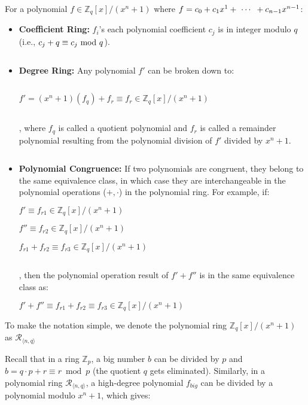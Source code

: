 \begin{tcolorbox}[title={\textbf{\tboxlabel{\ref*{subsec:poly-ring-overview}} Ring}}]

For a polynomial $f \in \mathbb{Z}_q[x] / (x^n + 1)$ where $f = c_0 + c_1x^1 + \text{ } \text{$\cdots$} \text{ } + c_{n-1}x^{n-1}$:

\begin{itemize}
\item \textbf{Coefficient Ring:} $f_i$'s each polynomial coefficient $c_j$ is in integer modulo $q$ (i.e., $c_j + q \equiv c_j \text{ } \text{\text{mod}} \text{ } q$). 

$ $

\item \textbf{Degree Ring:} Any polynomial $f'$ can be broken down to: 

$ $

$f' = (x^n + 1)(f_q) + f_r \equiv f_r \in \mathbb{Z}_q[x]/(x^n + 1)$

$ $

, where $f_q$ is called a quotient polynomial and $f_r$ is called a remainder polynomial resulting from the polynomial division of $f'$ divided by $x^n + 1$.

$ $

\item \textbf{Polynomial Congruence:} If two polynomials are congruent, they belong to the same equivalence class, in which case they are interchangeable in the polynomial operations ($+, \cdot$) in the polynomial ring. For example, if: 

$f' \equiv f_{r1} \in \mathbb{Z}_q[x] / (x^n + 1)$

$f{''} \equiv f_{r2} \in \mathbb{Z}_q[x] / (x^n + 1)$

$f_{r1} + f_{r2} \equiv f_{r3} \in \mathbb{Z}_q[x] / (x^n + 1)$

$ $

, then the polynomial operation result of $f' + f''$ is in the same equivalence class as: 

$f' + f'' \equiv f_{r1} + f_{r2} \equiv f_{r3} \in \mathbb{Z}_q[x] / (x^n + 1)$


\end{itemize}

To make the notation simple, we denote the polynomial ring $\mathbb{Z}_q[x] / (x^n + 1)$ as $\mathcal{R}_{\langle n, q \rangle}$
\end{tcolorbox}

Recall that in a ring $\mathbb{Z}_p$, a big number $b$ can be divided by $p$ and $b = q \cdot p + r \equiv r \bmod p$ (the quotient $q$ gets eliminated). Similarly, in a polynomial ring $\mathcal{R}_{\langle n, q \rangle}$, a high-degree polynomial $f_{big}$ can be divided by a polynomial modulo $x^n + 1$, which gives:

